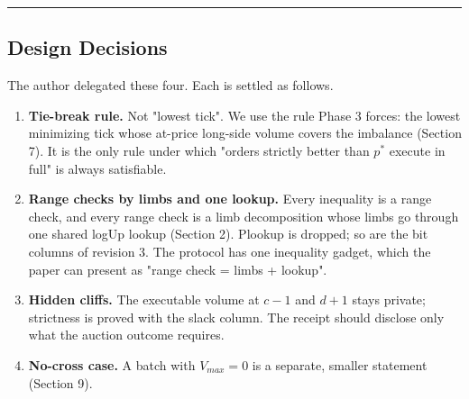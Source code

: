 \begin{center}\rule{0.5\linewidth}{0.5pt}\end{center}

\subsection{Design Decisions}

The author delegated these four. Each is settled as follows.

\begin{enumerate}
\def\labelenumi{\arabic{enumi}.}
\item
  \textbf{Tie-break rule.} Not "lowest tick". We use the rule Phase 3 forces: the lowest minimizing tick whose at-price long-side volume covers the imbalance (Section 7). It is the only rule under which "orders strictly better than \(p^*\) execute in full" is always satisfiable.
\item
  \textbf{Range checks by limbs and one lookup.} Every inequality is a range check, and every range check is a limb decomposition whose limbs go through one shared logUp lookup (Section 2). Plookup is dropped; so are the bit columns of revision 3. The protocol has one inequality gadget, which the paper can present as "range check = limbs + lookup".
\item
  \textbf{Hidden cliffs.} The executable volume at \(c-1\) and \(d+1\) stays private; strictness is proved with the slack column. The receipt should disclose only what the auction outcome requires.
\item
  \textbf{No-cross case.} A batch with \(V_{max} = 0\) is a separate, smaller statement (Section 9).
\end{enumerate}
